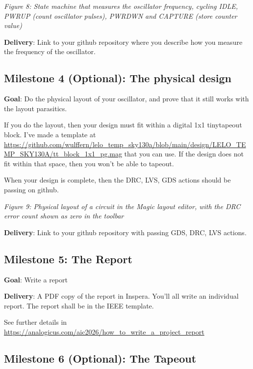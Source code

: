 {
\centering
{}
}

\emph{Figure 8: State machine that measures the oscillator frequency,
cycling IDLE, PWRUP (count oscillator pulses), PWRDWN and CAPTURE (store
counter value)}

\textbf{Delivery}: Link to your github repository where you describe how
you measure the frequency of the oscillator.

\subsection{Milestone 4 (Optional): The physical
design}\label{milestone-4-optional-the-physical-design}

\textbf{Goal}: Do the physical layout of your oscillator, and prove that
it still works with the layout parasitics.

If you do the layout, then your design must fit within a digital 1x1
tinytapeout block. I've made a template at
\url{https://github.com/wulffern/lelo_temp_sky130a/blob/main/design/LELO_TEMP_SKY130A/tt_block_1x1_pg.mag}
that you can use. If the design does not fit within that space, then you
won't be able to tapeout.

When your design is complete, then the DRC, LVS, GDS actions should be
passing on github.


{
\centering
{}
}

\emph{Figure 9: Physical layout of a circuit in the Magic layout editor,
with the DRC error count shown as zero in the toolbar}

\textbf{Delivery}: Link to your github repository with passing GDS, DRC,
LVS actions.

\subsection{Milestone 5: The Report}\label{milestone-5-the-report}

\textbf{Goal}: Write a report

\textbf{Delivery}: A PDF copy of the report in Inspera. You'll all write
an individual report. The report shall be in the IEEE template.

See further details in
\url{https://analogicus.com/aic2026/how_to_write_a_project_report}

\subsection{Milestone 6 (Optional): The
Tapeout}\label{milestone-6-optional-the-tapeout}

